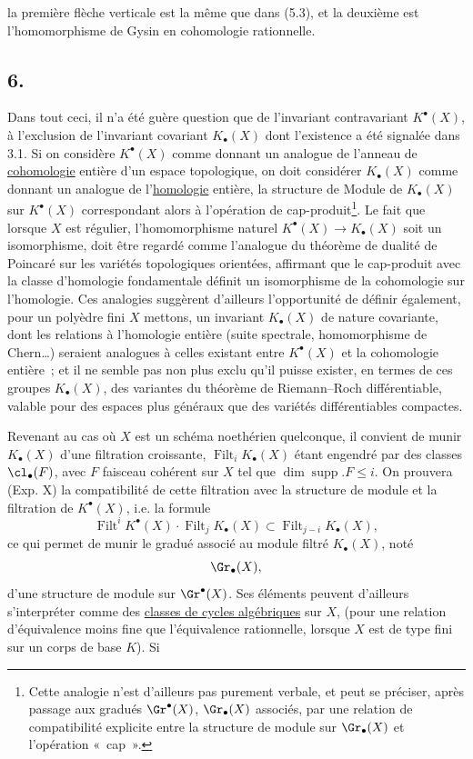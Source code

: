 la
premi\`ere fl\`eche verticale est la m\^eme que dans (5.3), et la deuxi\`eme est l'homomorphisme de Gysin en cohomologie rationnelle.

\subsection*{6.}
Dans tout ceci, il n'a \'et\'e gu\`ere question que de l'invariant contravariant $K^\bullet(X)$, \`a l'exclusion de l'invariant covariant $K_\bullet(X)$ dont l'existence a \'et\'e signal\'ee dans 3.1. Si on consid\`ere $K^\bullet(X)$ comme donnant un analogue de l'anneau de \underline{cohomologie} enti\`ere d'un espace topologique, on doit consid\'erer $K_\bullet(X)$ comme donnant un analogue de l'\underline{homologie} enti\`ere, la structure de Module de $K_\bullet(X)$ sur $K^\bullet(X)$ correspondant alors \`a l'op\'eration de cap-produit\footnote{Cette analogie n'est d'ailleurs pas purement verbale, et peut se pr\'eciser, apr\`es passage aux gradu\'es $\Gr^\bullet(X)$, $\Gr_\bullet(X)$ associ\'es, par une relation de compatibilit\'e explicite entre la structure de module sur $\Gr_\bullet(X)$ et l'op\'eration «~cap~».}. Le fait que lorsque $X$ est r\'egulier, l'homomorphisme naturel $K^\bullet(X)\to K_\bullet(X)$ soit un isomorphisme, doit \^etre regard\'e comme l'analogue du th\'eor\`eme de dualit\'e de Poincar\'e sur les vari\'et\'es topologiques orient\'ees, affirmant que le cap-produit avec la classe d'homologie fondamentale d\'efinit un isomorphisme de la cohomologie sur l'homologie. Ces analogies sugg\`erent d'ailleurs l'opportunit\'e de d\'efinir \'egalement, pour un poly\`edre fini $X$ mettons, un invariant $K_\bullet(X)$ de nature covariante, dont les relations \`a l'homologie enti\`ere (suite spectrale, homomorphisme de Chern\dots) seraient analogues \`a celles existant entre $K^\bullet(X)$ et la cohomologie enti\`ere~; et il ne semble pas non plus exclu qu'il puisse exister, en termes de ces groupes $K_\bullet(X)$, des variantes du th\'eor\`eme de Riemann--Roch diff\'erentiable, valable pour des espaces plus g\'en\'eraux que des vari\'et\'es diff\'erentiables compactes.

Revenant au cas o\`u $X$ est un sch\'ema noeth\'erien quelconque, il convient de munir $K_\bullet(X)$ d'une filtration croissante, $\operatorname{Filt}_iK_\bullet(X)$ \'etant engendr\'e par des classes $\cl_\bullet(F)$, avec $F$ faisceau coh\'erent sur $X$ tel que $\dim \operatorname{supp}.F\le i$. On prouvera (Exp. X) la compatibilit\'e de cette filtration avec la structure de module et la filtration de $K^\bullet(X)$, i.e. la formule
\begin{equation}\tag{6.1}
\operatorname{Filt}^iK^\bullet(X)\cdot \operatorname{Filt}_j K_\bullet(X)\subset \operatorname{Filt}_{j-i}K_\bullet(X),
\end{equation}
ce qui permet de munir le gradu\'e associ\'e au module filtr\'e $K_\bullet(X)$, not\'e
\[
\Gr_\bullet(X),
\]
d'une structure de module sur $\Gr^\bullet(X)$. Ses \'el\'ements peuvent d'ailleurs s'interpr\'eter comme des \uline{classes de cycles alg\'ebriques} sur $X$, (pour une relation d'\'equivalence moins fine que l'\'equivalence rationnelle, lorsque $X$ est de type fini sur un corps de base $K$). Si
